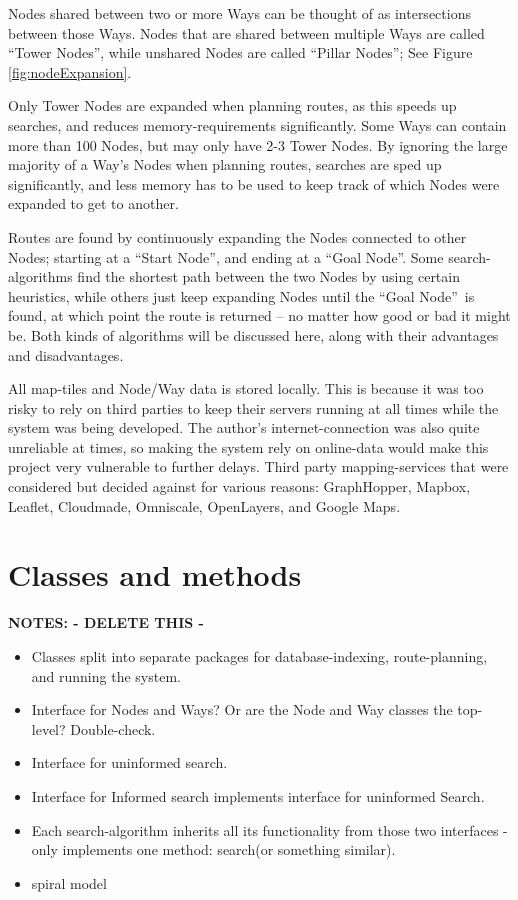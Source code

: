 Nodes shared between two or more Ways can be thought of as intersections between those Ways. Nodes that are shared between multiple Ways are called \textquotedblleft Tower Nodes\textquotedblright, while unshared Nodes are called \textquotedblleft Pillar Nodes\textquotedblright; See Figure \ref{fig:nodeExpansion}.

Only Tower Nodes are expanded when planning routes, as this speeds up searches, and reduces memory-requirements significantly. Some Ways can contain more than 100 Nodes, but may only have 2-3 Tower Nodes. By ignoring the large majority of a Way's Nodes when planning routes, searches are sped up significantly, and less memory has to be used to keep track of which Nodes were expanded to get to another.

Routes are found by continuously expanding the Nodes connected to other Nodes; starting at a \textquotedblleft Start Node\textquotedblright, and ending at a \textquotedblleft Goal Node\textquotedblright. Some search-algorithms find the shortest path between the two Nodes by using certain heuristics, while others just keep expanding Nodes until the \textquotedblleft Goal Node\textquotedblright~is found, at which point the route is returned -- no matter how good or bad it might be. Both kinds of algorithms will be discussed here, along with their advantages and disadvantages.

All map-tiles and Node/Way data is stored locally. This is because it was too risky to rely on third parties to keep their servers running at all times while the system was being developed. The author's internet-connection was also quite unreliable at times, so making the system rely on online-data would make this project very vulnerable to further delays. Third party mapping-services that were considered but decided against for various reasons: GraphHopper\cite{Graphhopper}, Mapbox\cite{mapbox}, Leaflet\cite{leaflet}, Cloudmade\cite{cloudmade}, Omniscale\cite{omniscale}, OpenLayers\cite{openlayers}, and Google Maps\cite{GoogleMaps}.

\section{Classes and methods}
\textbf{NOTES: - DELETE THIS -}
\begin{itemize}
\item Classes split into separate packages for database-indexing, route-planning, and running the system.
\item Interface for Nodes and Ways? Or are the Node and Way classes the top-level? Double-check.
\item Interface for uninformed search.
\item Interface for Informed search implements interface for uninformed Search.
\item Each search-algorithm inherits all its functionality from those two interfaces - only implements one method: search(or something similar).
\item spiral model%
\end{itemize}

